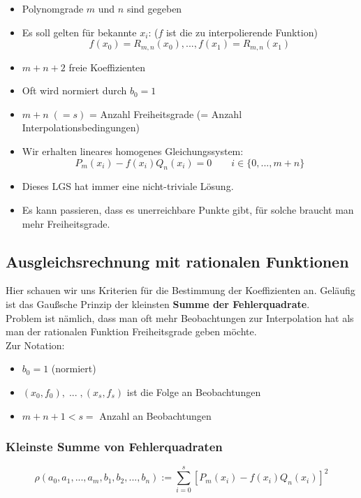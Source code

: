 \documentclass[a4paper]{article}
\begin{document}
\begin{itemize}
	\item Polynomgrade $m$ und $n$ sind gegeben
	\item Es soll gelten für bekannte $x_i$: ($f$ ist die zu 
		interpolierende Funktion)
		\[
			f(x_0) = R_{m, n} (x_0), ...,
			f(x_1) = R_{m, n} (x_1)
		\] 
	\item $m+n+2$ freie Koeffizienten
	\item Oft wird normiert durch $b_0 = 1$
	\item $m+n \; (=s)$ = Anzahl Freiheitsgrade (= Anzahl Interpolationsbedingungen)
	\item Wir erhalten lineares homogenes Gleichungssystem:
		\[
			P_m (x_i) - f(x_i) Q_n(x_i) = 0
			\qquad i \in \{
				0, ..., m+n
			\} 
		\] 
	\item Dieses LGS hat immer eine nicht-triviale Lösung.
	\item Es kann passieren, dass es unerreichbare Punkte gibt, für solche
		braucht man mehr Freiheitsgrade.
\end{itemize}

\subsection{Ausgleichsrechnung mit rationalen Funktionen}

Hier schauen wir uns Kriterien für die Bestimmung der Koeffizienten an.
Geläufig ist das Gaußsche Prinzip der kleinsten 
\textbf{Summe der Fehlerquadrate}.
\\

Problem ist nämlich, dass man oft mehr Beobachtungen zur Interpolation
hat als man der rationalen Funktion Freiheitsgrade geben möchte.
\\

Zur Notation:
\begin{itemize}
	\item $b_0 = 1$ (normiert)
	\item $(x_0, f_0), \; ... \;, (x_s, f_s)$
		ist die Folge an Beobachtungen
	\item $m + n + 1 < s =$ Anzahl an Beobachtungen
\end{itemize}

\subsubsection{Kleinste Summe von Fehlerquadraten}

\[
\rho \left(
	a_0, a_1, ..., a_m,
	b_1, b_2, ..., b_n
\right) :=
\sum_{i=0}^{s} \left[
	P_m (x_i) - f(x_i) Q_n (x_i)
\right] ^2
\] 
\end{document}
